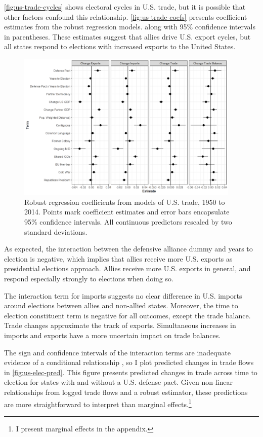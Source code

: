\documentclass[12pt]{article}
\begin{document}
\autoref{fig:us-trade-cycles} shows electoral cycles in U.S. trade, but it is possible that other factors confound this relationship.
\autoref{fig:us-trade-coefs} presents coefficient estimates from the robust regression models. along with 95\% confidence intervals in parentheses. 
These estimates suggest that allies drive U.S. export cycles, but all states respond to elections with increased exports to the United States. 


\begin{figure}
\centering
\includegraphics[width=0.95\textwidth]{../figures/us-trade-coefs.png}
\caption{Robust regression coefficients from models of U.S. trade, 1950 to 2014. Points mark coefficient estimates and error bars encapsulate 95\% confidence intervals. All continuous predictors rescaled by two standard deviations.}
\label{fig:us-trade-coefs}
\end{figure}


As expected, the interaction between the defensive alliance dummy and years to election is negative, which implies that allies receive more U.S. exports as presidential elections approach.
Allies receive more U.S. exports in general, and respond especially strongly to elections when doing so.


The interaction term for imports suggests no clear difference in U.S. imports around elections between allies and non-allied states. 
Moreover, the time to election constituent term is negative for all outcomes, except the trade balance. 
Trade changes approximate the track of exports. 
Simultaneous increases in imports and exports have a more uncertain impact on trade balances.
 


The sign and confidence intervals of the interaction terms are inadequate evidence of a conditional relationship \citep{BramborClarkGolder2006}, so I plot predicted changes in trade flows in \autoref{fig:us-elec-pred}.
This figure presents predicted changes in trade across time to election for states with and without a U.S. defense pact. 
Given non-linear relationships from logged trade flows and a robust estimator, these predictions are more straightforward to interpret than marginal effects.\footnote{I present marginal effects in the appendix.} 
\end{document}
